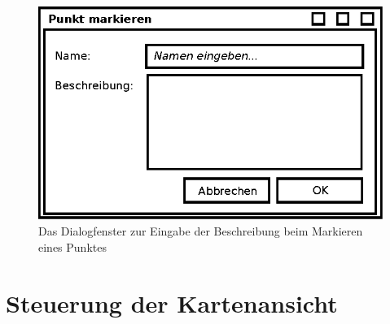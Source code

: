 \documentclass[10pt]{scrreprt}
\begin{document}
\begin{figure}
	\centering
	\includegraphics[scale=0.9]{GUI-Markieren.eps}
	\caption{Das Dialogfenster zur Eingabe der Beschreibung beim Markieren eines Punktes}
\end{figure}

\clearpage
\pagebreak

\section{Steuerung der Kartenansicht}
\end{document}
